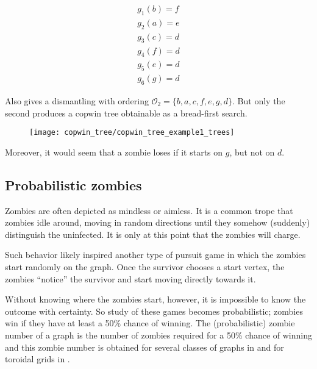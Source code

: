 \begin{align*}
  g_1(b) = f \\
  g_2(a) = e \\
  g_3(c) = d \\
  g_4(f) = d \\
  g_5(e) = d \\
  g_6(g) = d
\end{align*}

Also gives a dismantling with ordering $\mathcal{O}_2 = \{b, a, c, f, e, g, d \}$.
But only the second produces a copwin tree obtainable as a bread-first search.

\begin{figure}[h!]
\centering
\texttt{[image: copwin\_tree/copwin\_tree\_example1\_trees]}
\end{figure}

Moreover, it would seem that a zombie loses if it starts on $g$, but not on $d$.


\subsection{Probabilistic zombies}

Zombies are often depicted as mindless or aimless. It is a common trope that zombies
idle around, moving in random directions until they somehow (suddenly) distinguish
the uninfected. It is only at this point that the zombies will charge.

Such behavior likely inspired another type of pursuit game \cite{bonato2016probabilistic} in which the zombies start randomly on
the graph. Once the survivor chooses a start vertex, the zombies ``notice'' the survivor and start
moving directly towards it.

Without knowing where the zombies start, however, it is impossible to know the outcome with certainty.
So study of these games becomes probabilistic; zombies win if they have at least a 50\% chance of winning.
The (probabilistic) zombie number of a graph is the number of zombies required for a 50\% chance of winning and this zombie number is
obtained for several classes of graphs in \cite{bonato2016probabilistic} and for
toroidal grids in \cite{pralat2019many}.
